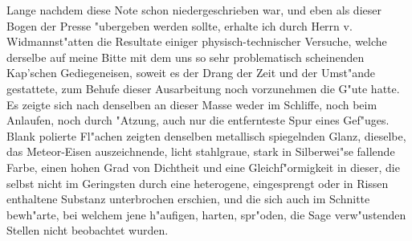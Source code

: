\documentclass[a4paper, 11pt, oneside, german]{article}
\begin{document}
{{\hspace*{6mm}Lange nachdem diese Note schon niedergeschrieben war, und eben als dieser Bogen der Presse "ubergeben werden sollte, erhalte ich durch Herrn v. Widmannst"atten die Resultate einiger physisch-technischer Versuche, welche derselbe auf meine Bitte mit dem uns so sehr problematisch scheinenden Kap’schen Gediegeneisen, soweit es der Drang der Zeit und der Umst"ande gestattete, zum Behufe dieser Ausarbeitung noch vorzunehmen die G"ute hatte. Es zeigte sich nach denselben an dieser Masse weder im Schliffe, noch beim Anlaufen, noch durch "Atzung, auch nur die entfernteste Spur eines Gef"uges.\\
Blank polierte Fl"achen zeigten denselben metallisch spiegelnden Glanz, dieselbe, das Meteor-Eisen auszeichnende, licht stahlgraue, stark in Silberwei"se fallende Farbe, einen hohen Grad von Dichtheit und eine Gleichf"ormigkeit in dieser, die selbst nicht im Geringsten durch eine heterogene, eingesprengt oder in Rissen enthaltene Substanz unterbrochen erschien, und die sich auch im Schnitte bewh"arte, bei welchem jene h"aufigen, harten, spr"oden, die Sage verw"ustenden Stellen nicht beobachtet wurden.\\
}}
\end{document}
